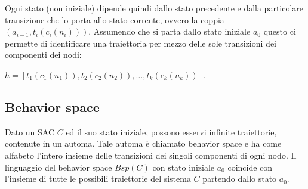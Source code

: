Ogni stato (non iniziale) dipende quindi dallo stato precedente e dalla particolare transizione che lo porta allo stato corrente, ovvero la coppia $(a_{i-1},t_i(c_i(n_i)))$. Assumendo che si parta dallo stato iniziale $a_0$ questo ci permette di identificare una traiettoria per mezzo delle sole transizioni dei componenti dei nodi:
\begin{center}
$h = [t_1(c_1(n_1)),t_2(c_2(n_2)), \ldots , t_k(c_k(n_k))]$.
\end{center}


\subsection{Behavior space}
Dato un SAC $C$ ed il suo stato iniziale, possono esservi infinite traiettorie, contenute in un automa. 
Tale automa è chiamato behavior space e ha come alfabeto l'intero insieme delle transizioni dei singoli componenti di ogni nodo.
Il linguaggio del behavior space $Bsp(C)$ con stato iniziale $a_0$ coincide con l'insieme di tutte le possibili traiettorie del sistema $C$ partendo dallo stato $a_0$. 
